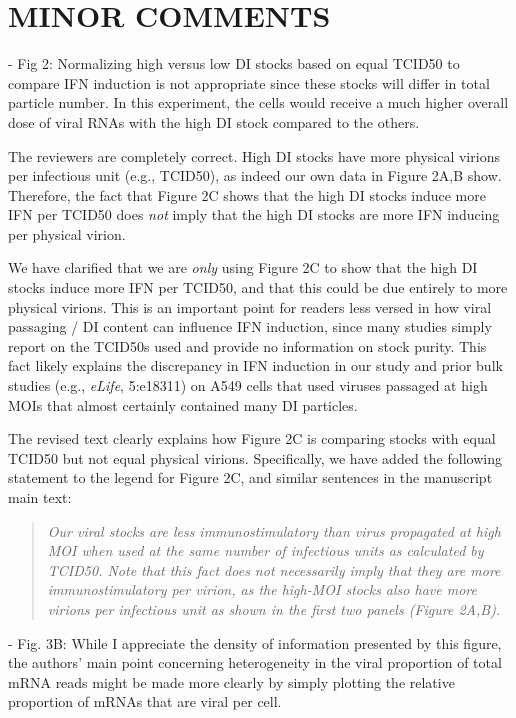 \documentclass[11pt, oneside]{article}   	%
\begin{document}
\section*{MINOR COMMENTS}

- Fig 2: Normalizing high versus low DI stocks based on equal TCID50 to compare IFN induction is not appropriate since these stocks will differ in total particle number. In this experiment, the cells would receive a much higher overall dose of viral RNAs with the high DI stock compared to the others. 

{\color{black}
The reviewers are completely correct.
High DI stocks have more physical virions per infectious unit (e.g., TCID50), as indeed our own data in Figure 2A,B show.
Therefore, the fact that Figure 2C shows that the high DI stocks induce more IFN per TCID50 does \emph{not} imply that the high DI stocks are more IFN inducing per physical virion.

We have clarified that we are \emph{only} using Figure 2C to show that the high DI stocks induce more IFN per TCID50, and that this could be due entirely to more physical virions.
This is an important point for readers less versed in how viral passaging / DI content can influence IFN induction, since many studies simply report on the TCID50s used and provide no information on stock purity.
This fact likely explains the discrepancy in IFN induction in our study and prior bulk studies (e.g., \textit{eLife}, 5:e18311) on A549 cells that used viruses passaged at high MOIs that almost certainly contained many DI particles.

The revised text clearly explains how Figure 2C is comparing stocks with equal TCID50 but not equal physical virions. 
Specifically, we have added the following statement to the legend for Figure 2C, and similar sentences in the manuscript main text:
\begin{quote}
\textsl{
Our viral stocks are less immunostimulatory than virus propagated at high MOI when used at the same number of infectious units as calculated by TCID50.
Note that this fact does not necessarily imply that they are more immunostimulatory per virion, as the high-MOI stocks also have more virions per infectious unit as shown in the first two panels (Figure 2A,B).}
\end{quote}
}

- Fig. 3B: While I appreciate the density of information presented by this figure, the authors' main point concerning heterogeneity in the viral proportion of total mRNA reads might be made more clearly by simply plotting the relative proportion of mRNAs that are viral per cell. 
\end{document}
